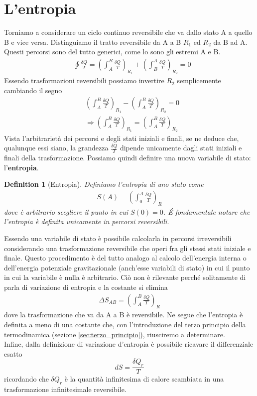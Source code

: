 \documentclass[10pt,a4paper]{article}
\newtheorem{definition}{Definition}
\begin{document}
\section{L'entropia}
Torniamo a considerare un ciclo continuo reversibile che va dallo stato A a quello B e vice versa. Distinguiamo il tratto reversibile da A a B \(R_1\) ed \(R_2\) da B ad A. Questi percorsi sono del tutto generici, come lo sono gli estremi A e B. 
\begin{align*}
	&\oint \frac{\delta Q}{T} = \left(\int_A^B  \frac{\delta Q}{T}\right)_{R_1} + \left(\int_B^A \frac{\delta Q}{T}\right)_{R_2}  = 0
\end{align*}
Essendo trasformazioni reversibili possiamo invertire \(R_2\) semplicemente cambiando il segno
\begin{align*}
	&\left(\int_A^B \frac{\delta Q}{T}\right)_{R_1} -\left(\int_A^B \frac{\delta Q}{T}\right)_{R_2} = 0  \\
	&\Rightarrow \left(\int_A^B \frac{\delta Q}{T}\right)_{R_1}   = \left(\int_A^B \frac{\delta Q}{T}\right)_{R_2} 
\end{align*}
Vista l'arbitrarietà dei percorsi e degli stati iniziali e finali, se ne deduce che, qualunque essi siano, la grandezza \(\frac{\delta Q}{T}\) dipende unicamente dagli stati iniziali e finali della trasformazione. Possiamo quindi definire una nuova variabile di stato: l'\textbf{entropia}.
\begin{definition}[Entropia]
	Definiamo l'entropia di uno stato come 
	\begin{align*}
		S(A) = \left(\int_0^A \frac{\delta Q}{T}\right)_{R}
	\end{align*}
	dove è arbitrario scegliere il punto in cui \(S(0)=0\). \'{E} fondamentale notare che l'entropia è definita unicamente in percorsi reversibili.
\end{definition}
 Essendo una variabile di stato è possibile calcolarla in percorsi irreversibili considerando una trasformazione reversibile che operi fra gli stessi stati iniziale e finale. Questo procedimento è del tutto analogo al calcolo dell'energia interna o dell'energia potenziale gravitazionale (anch'esse variabili di stato) in cui il punto in cui la variabile è nulla è arbitrario. Ciò non è rilevante perché solitamente di parla di variazione di entropia e la costante si elimina
\begin{align*}
	\Delta S_{AB} = \left(\int_A^B \frac{\delta Q}{T}\right)_R
\end{align*}
dove la trasformazione che va da A a B è reversibile. Ne segue che l'entropia è definita a meno di una costante che, con l'introduzione del terzo principio della termodinamica (sezione \ref{sec:terzo_principio}), riusciremo a determinare.\\
Infine, dalla definizione di variazione d'entropia è possibile ricavare il differenziale esatto 
\[dS = \frac{\delta Q_r}{T}\]
ricordando che \(\delta Q_r\) è la quantità infinitesima di calore scambiata in una trasformazione infinitesimale reversibile.
\end{document}

